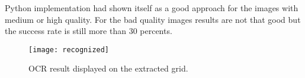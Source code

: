 \documentclass[../../main]{subfiles}
\begin{document}
Python implementation had shown itself as a good approach for the images with medium or high quality. For the bad quality images results are not that good but the success rate is still more than 30 percents.

\begin{figure} [ht!]
    \begin{center}
        \texttt{[image: recognized]}
        \caption{OCR result displayed on the extracted grid.}
        \label{fig:sudoku_ocr}
    \end{center}
\end{figure}
\end{document}
